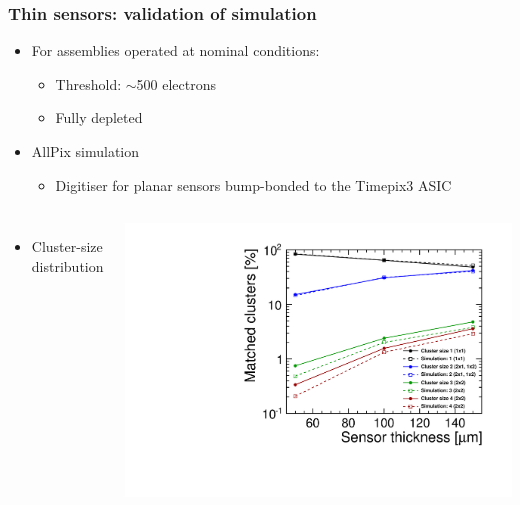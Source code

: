 \begin{frame}
  \frametitle{Thin sensors: validation of simulation}

  \begin{itemize}
  \item For assemblies operated at nominal conditions:
    \begin{itemize}
    \item Threshold: $\sim$500 electrons
    \item Fully depleted
    \end{itemize}
  \item AllPix simulation
    \begin{itemize}
    \item Digitiser for planar sensors bump-bonded to the Timepix3
      ASIC
    \end{itemize}
  \end{itemize}

  \begin{columns}
    \begin{itemize}
    \item Cluster-size distribution
    \end{itemize}
    \centering
    \includegraphics[width=\textwidth]{../figures/TestBeam/cluSize_vs_thickness.pdf}


\end{columns}
\end{frame}

